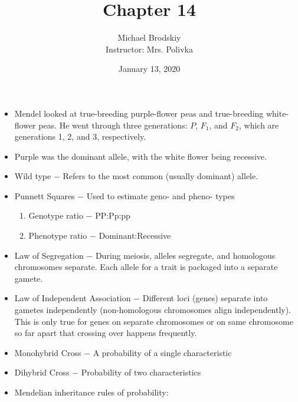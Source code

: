 \documentclass[12pt]{article}
\title{Chapter 14}
\date{January 13, 2020}
\author{Michael Brodskiy\\ \small Instructor: Mrs. Polivka}
\begin{document}
\maketitle

\begin{itemize}

  \item Mendel looked at true-breeding purple-flower peas and true-breeding white-flower peas. He went through three generations: $P$, $F_1$, and $F_2$, which are generations 1, 2, and 3, respectively.

  \item Purple was the dominant allele, with the white flower being recessive.

  \item Wild type $-$ Refers to the most common (usually dominant) allele.

  \item Punnett Squares $-$ Used to estimate geno- and pheno- types

    \begin{enumerate}

      \item Genotype ratio $-$ PP:Pp:pp

      \item Phenotype ratio $-$ Dominant:Recessive

    \end{enumerate}

  \item Law of Segregation $-$ During meiosis, alleles segregate, and homologous chromosomes separate. Each allele for a trait is packaged into a separate gamete.

  \item Law of Independent Association $-$ Different loci (genes) separate into gametes independently (non-homologous chromosomes align independently). This is only true for genes on separate chromosomes or on same chromosome so far apart that crossing over happens frequently.

  \item Monohybrid Cross $-$ A probability of a single characteristic

  \item Dihybrid Cross $-$ Probability of two characteristics

  \item Mendelian inheritance rules of probability:

    \begin{enumerate}


\end{enumerate}
\end{itemize}
\end{document}

